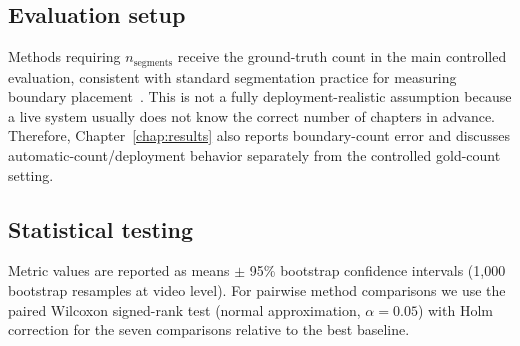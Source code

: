 \subsection{Evaluation setup}

Methods requiring $n_{\text{segments}}$ receive the ground-truth count in the
main controlled evaluation, consistent with standard segmentation practice
for measuring boundary placement~\citep{choi2000latent}. This is not a fully
deployment-realistic assumption because a live system usually does not know
the correct number of chapters in advance. Therefore, Chapter~\ref{chap:results}
also reports boundary-count error and discusses automatic-count/deployment
behavior separately from the controlled gold-count setting.

\subsection{Statistical testing}

Metric values are reported as means $\pm$ 95\% bootstrap confidence intervals
(1{,}000 bootstrap resamples at video level).
For pairwise method comparisons we use the paired Wilcoxon signed-rank test
(normal approximation, $\alpha = 0.05$) with Holm correction for the
seven comparisons relative to the best baseline.
